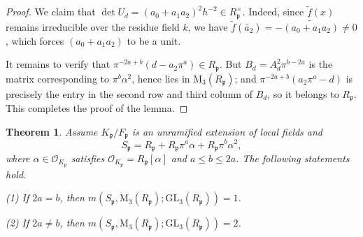 \documentclass[12pt]{article}
\theoremstyle{plain}
\newtheorem{theorem}{Theorem}[section]
\theoremstyle{definition}
\theoremstyle{remark}
\begin{document}
\begin{proof}
We claim that $\det U_d = (a_0+a_1a_2)^2 h^{-2} \in R_\mathfrak{p}^\times$. Indeed, since $\widetilde{f}(x)$ remains irreducible over the residue field $k$, we have $\widetilde{f}(\widetilde{a_2}) = -\widetilde{(a_0+a_1a_2)} \neq 0$, which forces $(a_0+a_1a_2)$ to be a unit.

It remains to verify that $\pi^{-2a+b} (d - a_2 \pi^{a})\in R_\mathfrak{p}$. But $B_d = A_d^2\pi^{b-2a}$ is the matrix corresponding to $\pi^b\alpha^2$, hence lies in $\mathrm{M}_3(R_\mathfrak{p})$; and $\pi^{-2a+b} (a_2 \pi^{a} - d)$ is precisely the entry in the second row and third column of $B_d$, so it belongs to $R_\mathfrak{p}$. This completes the proof of the lemma.
\end{proof}


\begin{theorem}\label{minert0}
Assume $K_\mathfrak{p}/F_\mathfrak{p}$ is an unramified extension of local fields and 
$$S_\mathfrak{p}=R_\mathfrak{p}+R_\mathfrak{p}\pi^a\alpha+R_\mathfrak{p}\pi^b\alpha^2,$$ 
where $\alpha\in \mathcal{O}_{K_\mathfrak{p}}$ satisfies $\mathcal{O}_{K_\mathfrak{p}}=R_\mathfrak{p}[\alpha]$ and $a\leq b \leq 2a$. The following statements hold.

(1) If $2a=b$, then $m(S_\mathfrak{p},\mathrm{M}_3(R_\mathfrak{p});\mathrm{GL}_3(R_\mathfrak{p}))=1$.

(2) If $2a\neq b$, then $m(S_\mathfrak{p},\mathrm{M}_3(R_\mathfrak{p});\mathrm{GL}_3(R_\mathfrak{p}))=2$.
\end{theorem}
\end{document}
